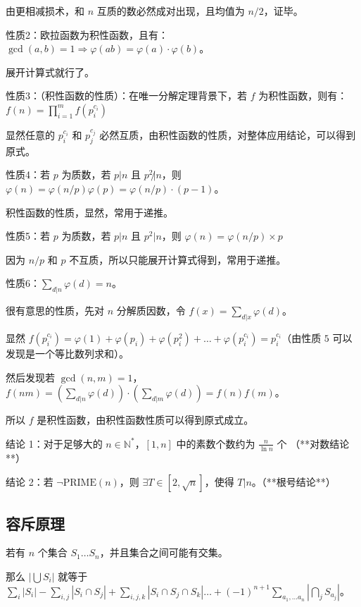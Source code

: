 \documentclass[titlepage, a4paper]{article}
\begin{document}
\begin{multicols}{2}
\begin{spacing}{0.6}
				 	由更相减损术，和 $n$ 互质的数必然成对出现，且均值为 $n/2$，证毕。
				 	
				 	性质2：欧拉函数为积性函数，且有：$\gcd(a,b)=1\Rightarrow \varphi(ab)=\varphi(a)\cdot\varphi(b)$。
				 	
				 	展开计算式就行了。
				 	
				 	性质3：（积性函数的性质）：在唯一分解定理背景下，若 $f$ 为积性函数，则有：$f(n)=\prod\limits_{i=1}^mf(p_i^{c_i})$
				 	
				 	显然任意的 $p_i^{c_i}$ 和 $p_j^{c_j}$ 必然互质，由积性函数的性质，对整体应用结论，可以得到原式。
				 	
				 	性质4：若 $p$ 为质数，若 $p|n$ 且 $p^2\not|n$，则 $\varphi(n)=\varphi(n/p)\varphi(p)=\varphi(n/p)\cdot(p-1)$。
				 	
				 	积性函数的性质，显然，常用于递推。
				 	
				 	性质5：若 $p$ 为质数，若 $p|n$ 且 $p^2|n$，则 $\varphi(n)= \varphi(n/p)\times p$
				 	
				 	因为 $n/p$ 和 $p$ 不互质，所以只能展开计算式得到，常用于递推。
				 	
				 	性质6：$\sum_{d|n}\varphi(d)=n$。
				 	
				 	很有意思的性质，先对 $n$ 分解质因数，令 $f(x)=\sum_{d|x}\varphi(d)$。
				 	
				 	显然 $f(p_i^{c_i}) = \varphi(1)+\varphi(p_i)+\varphi(p_i^{2})+\dots+\varphi(p_i^{c_i}) = p_i^{c_i}$（由性质 $5$ 可以发现是一个等比数列求和）。
				 	
				 	然后发现若 $\gcd(n,m)=1$，$f(nm)=(\sum_{d|n}\varphi(d))\cdot(\sum_{d|m}\varphi(d))=f(n)f(m)$。
				 	
				 	所以 $f$ 是积性函数，由积性函数性质可以得到原式成立。
				 	
				 	结论 1：对于足够大的 $n \in \mathbb{N}^*$，$[1,n]$ 中的素数个数约为 $\frac{n}{\ln n}$ 个 （**对数结论**）
				 	
				 	结论 2：若 $\lnot \text{PRIME}(n)$，则 $\exists T \in [2,\sqrt{n}]$，使得 $T|n$。（**根号结论**）
			 	\subsection{容斥原理}
			 		若有 $n$ 个集合 $S_1 \dots S_n$，并且集合之间可能有交集。
			 	
				 	那么 $|\bigcup S_i|$ 就等于 $\sum_i |S_i| - \sum_{i, j} |S_i \cap S_j| + \sum_{i, j, k} |S_i \cap S_j \cap S_k| \dots + (-1)^{n + 1} \sum_{a_1, \dots a_n} |\bigcap_j S_{a_j}|$。
				 	

\end{spacing}
\end{multicols}
\end{document}

